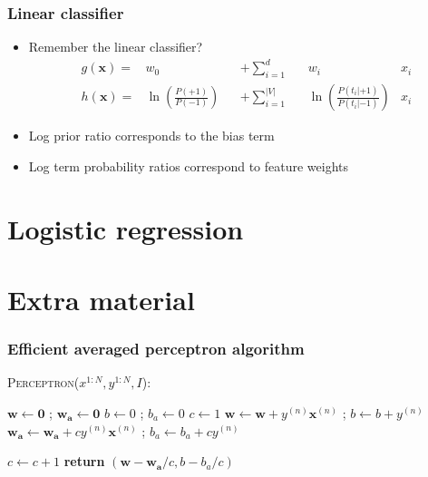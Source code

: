 \documentclass[14pt,mathserif]{beamer}
\newcommand{\vecb}[1]{\mathbf{#1}}
\newcommand{\x}{\mathbf{x}}
\begin{document}
\begin{frame}
  \frametitle{Linear classifier}
  \begin{itemize}
  \item Remember the linear classifier?
    \begin{align}\nonumber
      g(\x) = & w_0               &  & + \sum_{i=1}^d      && w_i 
                            & x_i \\\nonumber
      h(\x) = &  \ln\left(\frac{P(+1)}{P(-1)}\right)      &  & + \sum_{i=1}^{|V|}  &&  \ln\left(\frac{P(t_i|+1)}{P(t_i|-1)}\right)
                            & x_i 
    \end{align} 
  \item Log prior ratio corresponds to the bias term
  \item Log term probability ratios correspond to feature weights
  \end{itemize}
\end{frame}

\section{Logistic regression}

\section{Extra material}
\begin{frame}
\frametitle{Efficient averaged perceptron algorithm}
 \begin{block}{\textsc{Perceptron}($x^{1:N},y^{1:N},I$):}
\begin{algorithmic}[1]
\STATE $\vecb{w} \leftarrow \vecb{0}$ ; $\vecb{w_a} \leftarrow \vecb{0}$
\STATE $b \leftarrow 0$ ; $b_a \leftarrow 0$
\STATE $c \leftarrow 1$
    		\IF {$y^{(n)} (\vecb{w}\cdot \x^{(n)}+b) \leq 0$}
        		\STATE $\vecb{w} \leftarrow \vecb{w} + y^{(n)} \x^{(n)}$ ; $b \leftarrow b + y^{(n)}$
			\STATE $\vecb{w_a} \leftarrow \vecb{w_a} + c y^{(n)} \x^{(n)}$ ; $b_a \leftarrow b_a + c y^{(n)}$

    		\ENDIF
        \STATE $c \leftarrow c + 1$
    	\ENDFOR
\ENDFOR
\STATE \textbf{return} $(\vecb{w}-\vecb{w_a}/c, b - b_a/c)$
\end{algorithmic}                 \end{block}
\end{frame}
\end{document}

